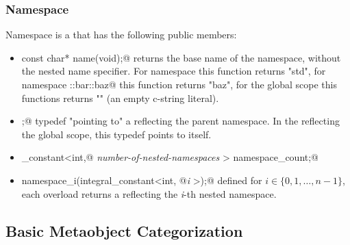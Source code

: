 \subsubsection{Namespace}

Namespace is a \verb@struct@ that has the following public members:

\begin{itemize}
\item{\verb@static const char* name(void);@} returns the base name
of the namespace, without the nested name specifier. For namespace
\verb@std@ this function returns "std", for namespace \verb@foo::bar::baz@
this function returns "baz", for the global scope this functions returns ""
(an empty c-string literal).

\item{ \verb@scope;@} typedef "pointing to"
a \verb@Namespace@ reflecting the parent namespace. In the \verb@Namespace@
reflecting the global scope, this typedef points to itself.

\item{\verb@integral_constant<int,@ {\em number-of-nested-namespaces}
\verb@> namespace_count;@}

\item{\verb@Namespace namespace_i(integral_constant<int, @{\em i}
\verb@>);@} defined for $i \in \{0, 1, \dots, n-1\}$, each overload
returns a \verb@Namespace@ reflecting the {\em i}-th nested namespace.
\end{itemize}

\subsection{Basic Metaobject Categorization}

